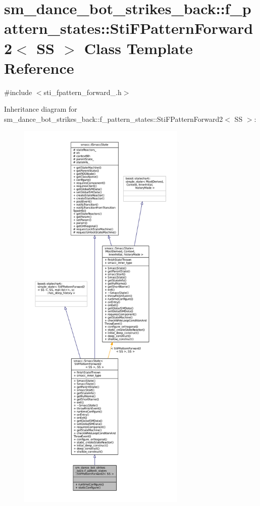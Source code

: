 \hypertarget{structsm__dance__bot__strikes__back_1_1f__pattern__states_1_1StiFPatternForward2}{}\section{sm\+\_\+dance\+\_\+bot\+\_\+strikes\+\_\+back\+:\+:f\+\_\+pattern\+\_\+states\+:\+:Sti\+F\+Pattern\+Forward2$<$ SS $>$ Class Template Reference}
\label{structsm__dance__bot__strikes__back_1_1f__pattern__states_1_1StiFPatternForward2}


{\ttfamily \#include $<$sti\+\_\+fpattern\+\_\+forward\+\_.\+h$>$}



Inheritance diagram for sm\+\_\+dance\+\_\+bot\+\_\+strikes\+\_\+back\+:\+:f\+\_\+pattern\+\_\+states\+:\+:Sti\+F\+Pattern\+Forward2$<$ SS $>$\+:
\nopagebreak
\begin{figure}[H]
\begin{center}
\leavevmode
\includegraphics[height=550pt]{structsm__dance__bot__strikes__back_1_1f__pattern__states_1_1StiFPatternForward2__inherit__graph}
\end{center}
\end{figure}


